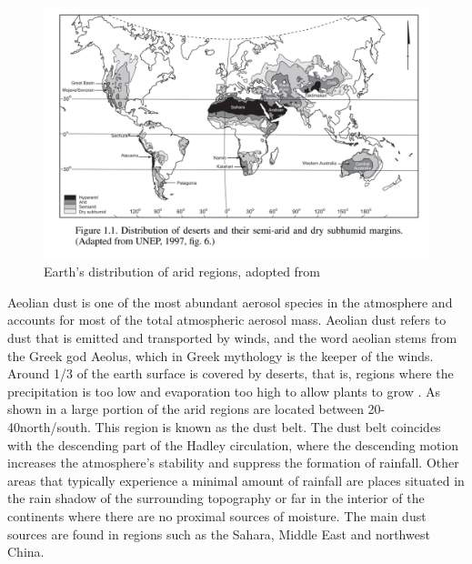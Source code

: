 \begin{figure}[htpb]
    \centering
    \includegraphics[width=\textwidth]{texfiles/figs/Desert_distrubtion.PNG}
    \caption{Earth's distribution of arid regions, adopted from \textcite{williams_climate_2014}}
    \label{fig:desert_distrubtion}
\end{figure}
Aeolian dust is one of the most abundant aerosol species in the atmosphere and accounts for most of the total atmospheric aerosol mass. Aeolian dust refers to dust that is emitted and transported by winds, and the word aeolian stems from the Greek god Aeolus, which in Greek mythology is the keeper of the winds. Around 1/3 of the earth surface is covered by deserts, that is, regions where the precipitation is too low and evaporation too high to allow plants to grow \parencite{williams_climate_2014}.
As shown in  a large portion of the arid regions are located between 20\degree - 40\degree north/south. This region is known as the dust belt. The dust belt coincides with the descending part of the Hadley circulation, where the descending motion increases the atmosphere's stability and suppress the formation of rainfall. 
Other areas that typically experience a minimal amount of rainfall are places situated in the rain shadow of the surrounding topography or far in the interior of the continents where there are no proximal sources of moisture.  
The main dust sources are found in regions such as the Sahara, Middle East and northwest China. 


